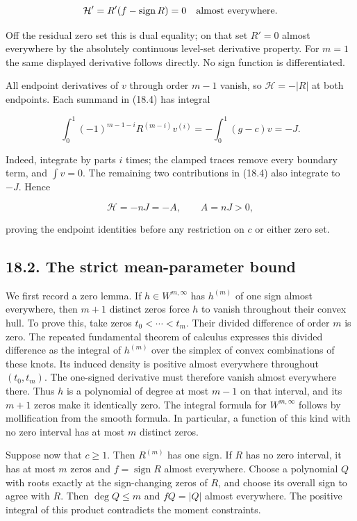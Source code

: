 \documentclass[11pt]{article}
\begin{document}
\[
\mathcal H'=R'(f-\operatorname{sign}R)=0
\quad\hbox{almost everywhere}.
\]

Off the residual zero set this is dual equality; on that set \(R'=0\)
almost everywhere by the absolutely continuous level-set derivative
property. For \(m=1\) the same displayed derivative follows directly. No
sign function is differentiated.

All endpoint derivatives of \(v\) through order \(m-1\) vanish, so
\(\mathcal H=-|R|\) at both endpoints. Each summand in (18.4) has
integral

\[
\int_0^1(-1)^{m-1-i}R^{(m-i)}v^{(i)}
=-\int_0^1(g-c)v=-J.
\]

Indeed, integrate by parts \(i\) times; the clamped traces remove every
boundary term, and \(\int v=0\). The remaining two contributions in
(18.4) also integrate to \(-J\). Hence

\[
\mathcal H=-nJ=-A,\qquad A=nJ>0,
\tag{18.5}
\]

proving the endpoint identities before any restriction on \(c\) or
either zero set.

\subsection{18.2. The strict mean-parameter
bound}\label{the-strict-mean-parameter-bound}

We first record a zero lemma. If \(h\in W^{m,\infty}\) has \(h^{(m)}\)
of one sign almost everywhere, then \(m+1\) distinct zeros force \(h\)
to vanish throughout their convex hull. To prove this, take zeros
\(t_0<\cdots<t_m\). Their divided difference of order \(m\) is zero. The
repeated fundamental theorem of calculus expresses this divided
difference as the integral of \(h^{(m)}\) over the simplex of convex
combinations of these knots. Its induced density is positive almost
everywhere throughout \((t_0,t_m)\). The one-signed derivative must
therefore vanish almost everywhere there. Thus \(h\) is a polynomial of
degree at most \(m-1\) on that interval, and its \(m+1\) zeros make it
identically zero. The integral formula for \(W^{m,\infty}\) follows by
mollification from the smooth formula. In particular, a function of this
kind with no zero interval has at most \(m\) distinct zeros.

Suppose now that \(c\ge1\). Then \(R^{(m)}\) has one sign. If \(R\) has
no zero interval, it has at most \(m\) zeros and
\(f=\operatorname{sign}R\) almost everywhere. Choose a polynomial \(Q\)
with roots exactly at the sign-changing zeros of \(R\), and choose its
overall sign to agree with \(R\). Then \(\deg Q\le m\) and \(fQ=|Q|\)
almost everywhere. The positive integral of this product contradicts the
moment constraints.
\end{document}
